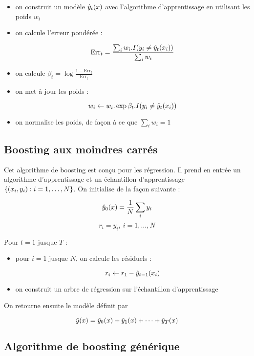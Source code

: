 	\begin{itemize}
		\item on construit un modèle $\hat{y}_t(x)$ avec l'algorithme d'apprentissage en utilisant les poids $w_i$
		\item on calcule l'erreur pondérée :
		
		$$\text{Err}_t = \frac{\sum_i w_i . I(y_i \neq \hat{y}_t(x_i))}{\sum_i w_i}$$
		
		\item on calcule $\beta_t = \log{\frac{1 - \text{Err}_t}{\text{Err}_t}}$
		\item on met à jour les poids :
		
		$$w_i \leftarrow w_i . \exp{\beta_t . I(y_i \neq \hat{y}_t(x_i))}$$
		
		\item on normalise les poids, de façon à ce que $\sum_i w_i = 1$
	\end{itemize}
	
		
	\subsection{Boosting aux moindres carrés}
	
	Cet algorithme de boosting est conçu pour les régression. Il prend en entrée un algorithme d'apprentissage et un échantillon d'apprentissage $\lbrace (x_i, y_i) : i = 1, \dots , N \rbrace$. On initialise de la façon suivante :
	
	$$\hat{y}_0(x) = \frac{1}{N} \sum_i y_i$$
	$$r_i = y_i, \: i = 1, \dots , N$$
	
	
	Pour $t = 1$ jusque $T$ :
	
	\begin{itemize}
		\item pour $i = 1$ jusque $N$, on calcule les résiduels :
		
		$$r_i \leftarrow r_1 - \hat{y}_{t - 1}(x_i)$$
		
		\item on construit un arbre de régression sur l'échantillon d'apprentissage
	\end{itemize}
	
	On retourne ensuite le modèle définit par
	
	$$\hat{y}(x) = \hat{y}_0(x) + \hat{y}_1(x) + \dots + \hat{y}_T(x)$$
	
	
	\subsection{Algorithme de boosting générique}
	

